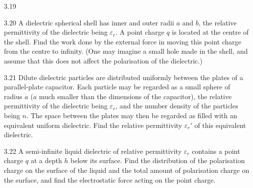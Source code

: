 \begin{figbox}{3.19}
\end{figbox}

\begin{problem}{3.20}
A dielectric spherical shell has inner and outer radii $a$ and $b$, the relative permittivity of the dielectric being $\varepsilon_r$. A point charge $q$ is located at the centre of the shell. Find the work done by the external force in moving this point charge from the centre to infinity. (One may imagine a small hole made in the shell, and assume that this does not affect the polarisation of the dielectric.)
\end{problem}

\begin{problem}{3.21}
Dilute dielectric particles are distributed uniformly between the plates of a parallel-plate capacitor. Each particle may be regarded as a small sphere of radius $a$ ($a$ much smaller than the dimensions of the capacitor), the relative permittivity of the dielectric being $\varepsilon_r$, and the number density of the particles being $n$. The space between the plates may then be regarded as filled with an equivalent uniform dielectric. Find the relative permittivity $\varepsilon_r'$ of this equivalent dielectric.
\end{problem}

\begin{problem}{3.22}
A semi-infinite liquid dielectric of relative permittivity $\varepsilon_r$ contains a point charge $q$ at a depth $h$ below its surface. Find the distribution of the polarisation charge on the surface of the liquid and the total amount of polarisation charge on the surface, and find the electrostatic force acting on the point charge.
\end{problem}

